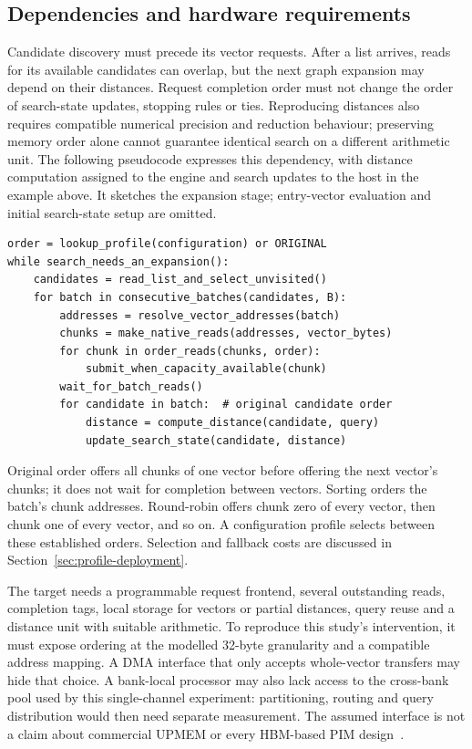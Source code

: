 \subsection{Dependencies and hardware requirements}
Candidate discovery must precede its vector requests. After a list arrives, reads for its available candidates can overlap, but the next graph expansion may depend on their distances. Request completion order must not change the order of search-state updates, stopping rules or ties. Reproducing distances also requires compatible numerical precision and reduction behaviour; preserving memory order alone cannot guarantee identical search on a different arithmetic unit. The following pseudocode expresses this dependency, with distance computation assigned to the engine and search updates to the host in the example above. It sketches the expansion stage; entry-vector evaluation and initial search-state setup are omitted.

\begin{minipage}{\textwidth}
\begin{lstlisting}
order = lookup_profile(configuration) or ORIGINAL
while search_needs_an_expansion():
    candidates = read_list_and_select_unvisited()
    for batch in consecutive_batches(candidates, B):
        addresses = resolve_vector_addresses(batch)
        chunks = make_native_reads(addresses, vector_bytes)
        for chunk in order_reads(chunks, order):
            submit_when_capacity_available(chunk)
        wait_for_batch_reads()
        for candidate in batch:  # original candidate order
            distance = compute_distance(candidate, query)
            update_search_state(candidate, distance)
\end{lstlisting}
\end{minipage}

Original order offers all chunks of one vector before offering the next vector's chunks; it does not wait for completion between vectors. Sorting orders the batch's chunk addresses. Round-robin offers chunk zero of every vector, then chunk one of every vector, and so on. A configuration profile selects between these established orders. Selection and fallback costs are discussed in Section~\ref{sec:profile-deployment}.

The target needs a programmable request frontend, several outstanding reads, completion tags, local storage for vectors or partial distances, query reuse and a distance unit with suitable arithmetic. To reproduce this study's intervention, it must expose ordering at the modelled 32-byte granularity and a compatible address mapping. A DMA interface that only accepts whole-vector transfers may hide that choice. A bank-local processor may also lack access to the cross-bank pool used by this single-channel experiment: partitioning, routing and query distribution would then need separate measurement. The assumed interface is not a claim about commercial UPMEM or every HBM-based PIM design~\cite{primer,upanns}.


